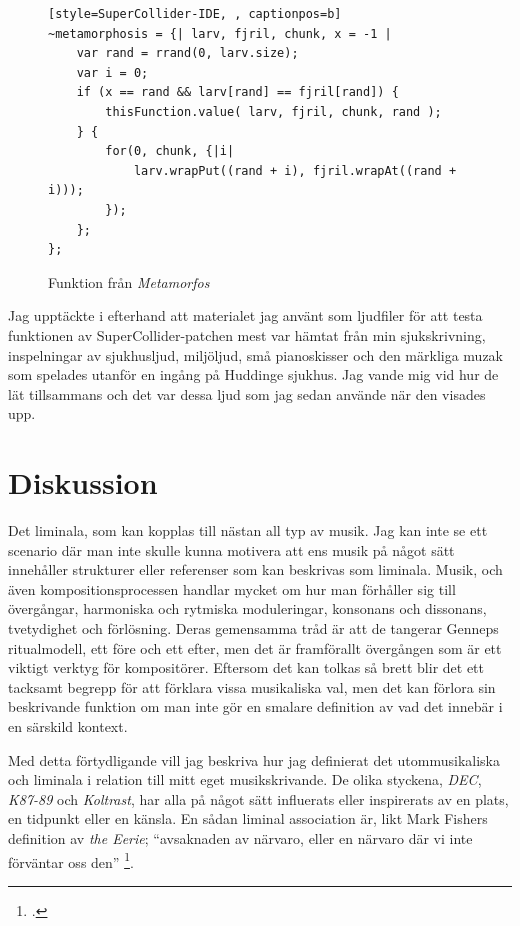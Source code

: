 \documentclass{article}
\renewcommand{\baselinestretch}{1.5}
\begin{document}
\begin{figure}[hb]
\renewcommand{\baselinestretch}{1}
\begin{lstlisting}[style=SuperCollider-IDE, , captionpos=b]
~metamorphosis = {| larv, fjril, chunk, x = -1 |
	var rand = rrand(0, larv.size);
	var i = 0;
	if (x == rand && larv[rand] == fjril[rand]) {
		thisFunction.value( larv, fjril, chunk, rand );
	} {
		for(0, chunk, {|i|
			larv.wrapPut((rand + i), fjril.wrapAt((rand + i)));
		});
	};
};
\end{lstlisting}
\caption{Funktion från \emph{Metamorfos}}
\end{figure}
\renewcommand{\baselinestretch}{1.5}
\pagebreak

Jag upptäckte i efterhand att materialet jag använt som ljudfiler för att testa funktionen av
SuperCollider-patchen mest var hämtat från min sjukskrivning, inspelningar av sjukhusljud, miljöljud, små
pianoskisser och den märkliga muzak som spelades utanför en ingång på Huddinge sjukhus. Jag vande mig vid hur
de lät tillsammans och det var dessa ljud som jag sedan använde när den visades upp. 

\pagebreak
\section{Diskussion}
Det liminala, som  kan kopplas till nästan all typ av musik. Jag kan inte se ett scenario där man inte skulle
kunna motivera att ens musik på något sätt innehåller strukturer eller referenser som kan beskrivas som
liminala. Musik, och även kompositionsprocessen handlar mycket om hur man förhåller sig till övergångar,
harmoniska och rytmiska moduleringar, konsonans och dissonans, tvetydighet och förlösning. Deras gemensamma
tråd är att de tangerar Genneps ritualmodell, ett före och ett efter, men det är framförallt övergången som är
ett viktigt verktyg för kompositörer. Eftersom det kan tolkas så brett blir det ett tacksamt begrepp för att
förklara vissa musikaliska val, men det kan förlora sin beskrivande funktion om man inte gör en smalare
definition av vad det innebär i en särskild kontext.

Med detta förtydligande vill jag beskriva hur jag definierat det utommusikaliska och liminala i
relation till mitt eget musikskrivande. De olika styckena, \emph{DEC}, \emph{K87-89} och \emph{Koltrast}, har
alla på något sätt influerats eller inspirerats av en plats, en tidpunkt eller en känsla. 
En sådan liminal association är, likt Mark Fishers definition av \emph{the Eerie};
``avsaknaden av närvaro, eller en närvaro där vi inte förväntar oss den''
\footcite[Egen översättning, s. 12]{Fisher}.
\end{document}
